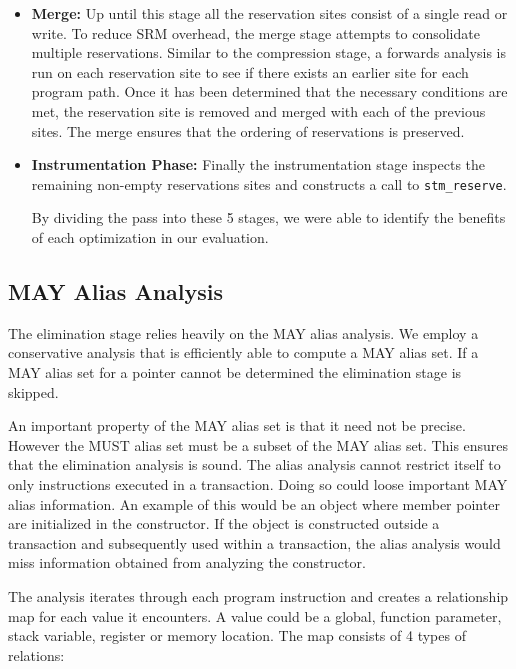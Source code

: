\documentclass[preprint]{sigplanconf}
\begin{document}
\begin{itemize}
\item {\bf Merge:} Up until this stage all the reservation sites consist of a single read or write. To reduce SRM overhead, the merge stage attempts to consolidate multiple reservations. Similar to the compression stage, a forwards analysis is run on each reservation site to see if there exists an earlier site for each program path. Once it has been determined that the necessary conditions are met, the reservation site is removed and merged with each of the previous sites. The merge ensures that the ordering of reservations is preserved.

\item {\bf Instrumentation Phase:} Finally the instrumentation stage inspects the remaining non-empty reservations sites and constructs a call to \verb+stm_reserve+.

By dividing the pass into these 5 stages, we were able to identify the benefits of each optimization in our evaluation.

\end{itemize}

\subsection{MAY Alias Analysis}

The elimination stage relies heavily on the MAY alias analysis. We employ a conservative analysis that is efficiently able to compute a MAY alias set. If a MAY alias set for a pointer cannot be determined the elimination stage is skipped.

An important property of the MAY alias set is that it need not be precise. However the MUST alias set must be a subset of the MAY alias set. This ensures that the elimination analysis is sound. The alias analysis cannot restrict itself to only instructions executed in a transaction. Doing so could loose important MAY alias information. An example of this would be an object where member pointer are initialized in the constructor. If the object is constructed outside a transaction and subsequently used within a transaction, the alias analysis would miss information obtained from analyzing the constructor.

The analysis iterates through each program instruction and creates a relationship map for each value it encounters. A value could be a global, function parameter, stack variable, register or memory location. The map consists of 4 types of relations:
\end{document}
